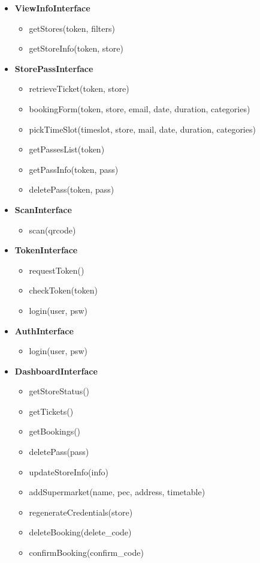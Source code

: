 \begin{itemize}
	\item \textbf{ViewInfoInterface}
	\begin{itemize}
		\item getStores(token, filters)
		\item getStoreInfo(token, store)
	\end{itemize}

	
	\item \textbf{StorePassInterface}
	\begin{itemize}
		\item retrieveTicket(token, store)
		\item bookingForm(token, store, email, date, duration, categories)
		\item pickTimeSlot(timeslot, store, mail, date, duration, categories)
		\item getPassesList(token)
		\item getPassInfo(token, pass)
		\item deletePass(token, pass)
	\end{itemize}

	\item \textbf{ScanInterface}
	\begin{itemize}
		\item scan(qrcode)
	\end{itemize}
	
	\item \textbf{TokenInterface}
	\begin{itemize}
		\item requestToken()
		\item checkToken(token)
		\item login(user, psw)
	\end{itemize}

	\item \textbf{AuthInterface}
	\begin{itemize}
		\item login(user, psw)
	\end{itemize}

	\item \textbf{DashboardInterface}
	\begin{itemize}
		\item getStoreStatus()
		\item getTickets()
		\item getBookings()
		\item deletePass(pass)
		\item updateStoreInfo(info)
		\item addSupermarket(name, pec, address, timetable)
		\item regenerateCredentials(store)
		\item deleteBooking(delete_code)
		\item confirmBooking(confirm_code)
	\end{itemize}


\end{itemize}
